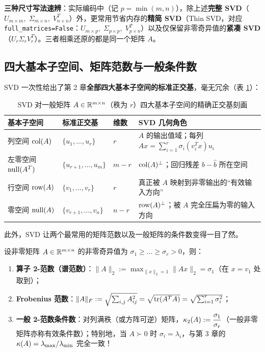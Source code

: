 \textbf{三种尺寸写法速辨}：实际编码中（记 $p = \min(m, n)$），除上述\textbf{完整 SVD}（$U_{m\times m},\;\Sigma_{m\times n},\;V^T_{n\times n}$）外，更常用节省内存的\textbf{精简 SVD}（Thin SVD，对应 \texttt{full\_matrices=False}：$U_{m\times p},\;\Sigma_{p\times p},\;V^T_{p\times n}$）以及仅保留非零奇异值的\textbf{紧凑 SVD}（$U_r \Sigma_r V_r^T$）。三者相乘还原的都是同一个矩阵 $A$。

\subsection{四大基本子空间、矩阵范数与一般条件数}

SVD 一次性给出了第 2 章\textbf{全部四大基本子空间的标准正交基}，毫无冗余（表 \ref{tab:ch4-subspaces}）：

\begin{table}[htbp]
  \centering
  \caption{SVD 对一般矩阵 $A \in \mathbb{R}^{m\times n}$（秩为 $r$）四大基本子空间的精确正交基刻画}
  \label{tab:ch4-subspaces}
  \small
  \begin{tabularx}{\linewidth}{@{}p{26mm}p{38mm}p{16mm}X@{}}
    \toprule
    \textbf{基本子空间} & \textbf{标准正交基} & \textbf{维数} & \textbf{SVD 几何角色} \\
    \midrule
    列空间 $\operatorname{col}(A)$ & $\{u_1, \dots, u_r\}$ & $r$ & $A$ 的输出值域；每列 $Ax = \sum_{i=1}^r \sigma_i(v_i^T x)u_i$ \\
    左零空间 $\operatorname{null}(A^T)$ & $\{u_{r+1}, \dots, u_m\}$ & $m - r$ & $\operatorname{col}(A)^\perp$；回归残差 $b - \hat{b}$ 所在空间 \\
    行空间 $\operatorname{row}(A)$ & $\{v_1, \dots, v_r\}$ & $r$ & 真正被 $A$ 映射到非零输出的“有效输入方向” \\
    零空间 $\operatorname{null}(A)$ & $\{v_{r+1}, \dots, v_n\}$ & $n - r$ & $\operatorname{row}(A)^\perp$；被 $A$ 完全压扁为零的输入方向 \\
    \bottomrule
  \end{tabularx}
\end{table}

此外，SVD 让两个最常用的矩阵范数以及一般矩阵的条件数变得一目了然。

\begin{proposition}
\label{prop:ch4-norms}
设非零矩阵 $A \in \mathbb{R}^{m\times n}$ 的非零奇异值为 $\sigma_1 \ge \dots \ge \sigma_r > 0$，则：
\begin{enumerate}
  \item \textbf{算子 2-范数（谱范数）}：$\|A\|_2 := \max_{\|x\|_2 = 1} \|Ax\|_2 = \sigma_1$（在 $x = v_1$ 处取到）；
  \item \textbf{Frobenius 范数}：$\|A\|_F := \sqrt{\sum_{i,j} A_{ij}^2} = \sqrt{\operatorname{tr}(A^T A)} = \sqrt{\sum_{i=1}^r \sigma_i^2}$；
  \item \textbf{一般 2-范数条件数}：对列满秩（或方阵可逆）矩阵，$\kappa_2(A) := \dfrac{\sigma_1}{\sigma_r}$（一般非零矩阵亦称有效条件数）；特别地，当 $A \succ 0$ 时 $\sigma_i = \lambda_i$，与第 3 章的 $\kappa(A) = \lambda_{\max}/\lambda_{\min}$ 完全一致！
\end{enumerate}
\end{proposition}

